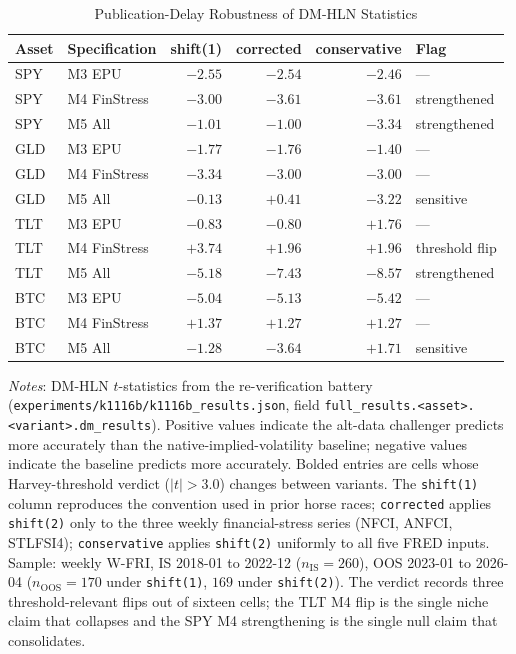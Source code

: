\documentclass[12pt,a4paper]{article}
\begin{document}
\begin{table}[H]
\centering
\small
\begin{threeparttable}
\caption{Publication-Delay Robustness of DM-HLN Statistics}
\label{tab:k1116b_robust}
\begin{tabular}{@{}llrrrl@{}}
\toprule
Asset & Specification & shift(1) & corrected & conservative & Flag \\
\midrule
SPY & M3 EPU & $-2.55$ & $-2.54$ & $-2.46$ & --- \\
SPY & M4 FinStress & $-3.00$ & $\mathbf{-3.61}$ & $-3.61$ & strengthened \\
SPY & M5 All & $-1.01$ & $-1.00$ & $\mathbf{-3.34}$ & strengthened \\
GLD & M3 EPU & $-1.77$ & $-1.76$ & $-1.40$ & --- \\
GLD & M4 FinStress & $-3.34$ & $-3.00$ & $-3.00$ & --- \\
GLD & M5 All & $-0.13$ & $+0.41$ & $-3.22$ & sensitive \\
TLT & M3 EPU & $-0.83$ & $-0.80$ & $+1.76$ & --- \\
TLT & M4 FinStress & $\mathbf{+3.74}$ & $\mathbf{+1.96}$ & $+1.96$ & threshold flip \\
TLT & M5 All & $-5.18$ & $-7.43$ & $-8.57$ & strengthened \\
BTC & M3 EPU & $-5.04$ & $-5.13$ & $-5.42$ & --- \\
BTC & M4 FinStress & $+1.37$ & $+1.27$ & $+1.27$ & --- \\
BTC & M5 All & $-1.28$ & $\mathbf{-3.64}$ & $+1.71$ & sensitive \\
\bottomrule
\end{tabular}
\begin{tablenotes}
\small
\item \textit{Notes}: DM-HLN $t$-statistics from the re-verification battery (\texttt{experiments/k1116b/k1116b\_results.json}, field \texttt{full\_results.<asset>.<variant>.dm\_results}). Positive values indicate the alt-data challenger predicts more accurately than the native-implied-volatility baseline; negative values indicate the baseline predicts more accurately. Bolded entries are cells whose Harvey-threshold verdict ($|t|>3.0$) changes between variants. The \texttt{shift(1)} column reproduces the convention used in prior horse races; \texttt{corrected} applies \texttt{shift(2)} only to the three weekly financial-stress series (NFCI, ANFCI, STLFSI4); \texttt{conservative} applies \texttt{shift(2)} uniformly to all five FRED inputs. Sample: weekly W-FRI, IS 2018-01 to 2022-12 ($n_{\text{IS}}=260$), OOS 2023-01 to 2026-04 ($n_{\text{OOS}}=170$ under \texttt{shift(1)}, $169$ under \texttt{shift(2)}). The verdict records three threshold-relevant flips out of sixteen cells; the TLT M4 flip is the single niche claim that collapses and the SPY M4 strengthening is the single null claim that consolidates.
\end{tablenotes}
\end{threeparttable}
\end{table}
\end{document}
